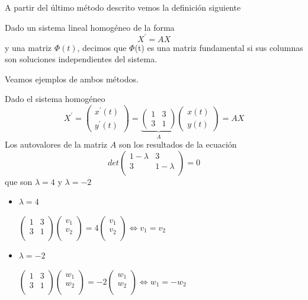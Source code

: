 \documentclass{mathnotes}
\begin{document}
A partir del último método descrito vemos la definición siguiente

\begin{definition}
Dado un sistema lineal homogéneo de la forma $$X^\prime = AX$$
y una matriz $\Phi(t)$, decimos que $\Phi$(t) es una matriz fundamental si sus columnas son soluciones independientes del sistema.
\end{definition}

Veamos ejemplos de ambos métodos.

\begin{example} [(Método 1)]
Dado el sistema homogéneo$$X^\prime = \begin{pmatrix}
x^\prime(t)\\y^\prime(t)
\end{pmatrix}
= \underbrace{\begin{pmatrix}
1 & 3\\3 & 1
\end{pmatrix}}_{A}\begin{pmatrix}
x(t)\\y(t)
\end{pmatrix} = AX$$
Los autovalores de la matriz $A$ son los resultados de la ecuación $$det\begin{pmatrix}
1-\lambda & 3\\3 &1-\lambda\\
\end{pmatrix}=0$$
que son $\lambda = 4$ y $\lambda = -2$
\begin{itemize}
\item $\lambda = 4$

$\begin{pmatrix}
1 & 3\\ 3 & 1\\
\end{pmatrix}\begin{pmatrix}
v_1\\v_2\\
\end{pmatrix} = 4\begin{pmatrix}
v_1\\v_2\\
\end{pmatrix} \iff v_1 = v_2$

\item $\lambda = -2$

$\begin{pmatrix}
1 & 3\\ 3 & 1\\
\end{pmatrix}\begin{pmatrix}
w_1\\w_2\\
\end{pmatrix} = -2\begin{pmatrix}
w_1\\w_2\\
\end{pmatrix} \iff w_1 = -w_2$
\end{itemize}


\end{example}
\end{document}
